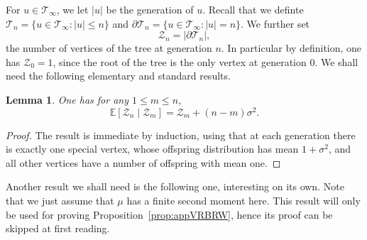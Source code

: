 \documentclass[10pt,a4paper]{amsart}
\newtheorem {lem} {Lemma} [section]
\newcommand{\1}{{\text{\Large $\mathfrak 1$}}}
\begin{document}
For $u\in \mathcal T_\infty$, we let $|u|$ be the generation of $u$. Recall that we definte $\mathcal T_n = \{u\in \mathcal T_\infty : |u|\le n\}$ and $\partial \mathcal T_n = \{u\in \mathcal T_\infty : |u|=  n\}$. We further set 
$$\mathcal Z_n= |\partial \mathcal T_n|,$$  
the number of vertices of the tree at generation $n$.  In particular by definition, one has $\mathcal Z_0 = 1$, since the root of the tree is the only vertex at generation $0$. We shall need the following elementary and standard results. 
\begin{lem}\label{lem:esp}
One has for any $1\le m \le n$, 
$$ \mathbb E[\mathcal Z_n\mid \mathcal Z_m] = \mathcal Z_m +  (n-m)\sigma^2. $$
\end{lem}
\begin{proof}
The result is immediate by induction, using that at each generation there is exactly one special vertex, whose offspring distribution has mean $1+\sigma^2$, and all other vertices have a number of offspring with mean one. 
\end{proof}

Another result we shall need is the following one, interesting on its own. Note that we just assume that $\mu$ has a finite second moment here.  
This result will only be used for proving Proposition~\ref{prop:appVRBRW}, hence its proof can be skipped at first reading. 
\end{document}
